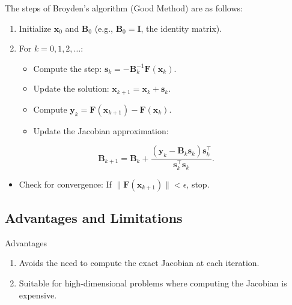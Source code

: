 \documentclass[%
oneside,                 %
final,                   %
10pt]{article}
\begin{document}
The steps of Broyden’s algorithm (Good Method) are as follows:
\begin{enumerate}
\item Initialize \( \mathbf{x}_0 \) and \( \mathbf{B}_0 \) (e.g., \( \mathbf{B}_0 = \mathbf{I} \), the identity matrix).

\item For \( k = 0, 1, 2, \dots \):
\begin{itemize}

  \item Compute the step: \( \mathbf{s}_k = -\mathbf{B}_k^{-1} \mathbf{F}(\mathbf{x}_k) \).

  \item Update the solution: \( \mathbf{x}_{k+1} = \mathbf{x}_k + \mathbf{s}_k \).

  \item Compute \( \mathbf{y}_k = \mathbf{F}(\mathbf{x}_{k+1}) - \mathbf{F}(\mathbf{x}_k) \).

  \item Update the Jacobian approximation:
\end{itemize}

\noindent
\end{enumerate}

\noindent
       \[
       \mathbf{B}_{k+1} = \mathbf{B}_k + \frac{(\mathbf{y}_k - \mathbf{B}_k \mathbf{s}_k) \mathbf{s}_k^\top}{\mathbf{s}_k^\top \mathbf{s}_k}.
       \]
\begin{itemize}
  \item Check for convergence: If \( \|\mathbf{F}(\mathbf{x}_{k+1})\| < \epsilon \), stop.
\end{itemize}

\noindent
\subsection{Advantages and Limitations}

\begin{block}{Advantages }
\begin{enumerate}
\item Avoids the need to compute the exact Jacobian at each iteration.

\item Suitable for high-dimensional problems where computing the Jacobian is expensive.
\end{enumerate}

\noindent
\end{block}
\end{document}
